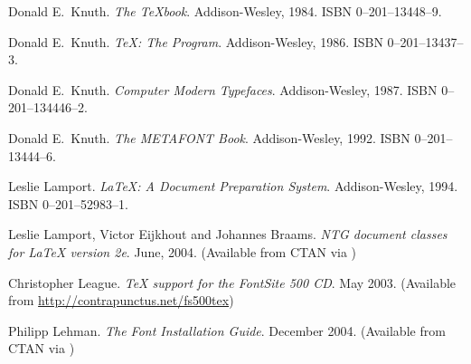 \begin{thebibliography}{GMS94A}
  Donald E.~Knuth.
  \newblock \emph{The TeXbook}.
  \newblock Addison-Wesley, 1984.
  \newblock ISBN 0--201--13448--9.

  Donald E.~Knuth.
  \newblock \emph{TeX: The Program}.
  \newblock Addison-Wesley, 1986.
  \newblock ISBN 0--201--13437--3.

  Donald E.~Knuth.
  \newblock \emph{Computer Modern Typefaces}.
  \newblock Addison-Wesley, 1987.
  \newblock ISBN 0--201--134446--2.

  Donald E.~Knuth.
  \newblock \emph{The METAFONT Book}.
  \newblock Addison-Wesley, 1992.
  \newblock ISBN 0--201--13444--6.

  Leslie Lamport.
  \newblock \emph{LaTeX: A Document Preparation System}.
  \newblock Addison-Wesley, 1994.
  \newblock ISBN 0--201--52983--1.

  Leslie Lamport, Victor Eijkhout and Johannes Braams.
  \newblock \emph{NTG document classes for LaTeX version 2e}.
  \newblock June, 2004.
  \newblock (Available from CTAN via
  ) 

\begin{comment}
\bibitem[LMB99]{CLASSES}
  Leslie Lamport, Frank Mittelbach and Johannes Braams.
  \newblock \emph{Standard document classes for LaTeX version 2e}.
  \newblock September, 1999.
  \newblock (Available from CTAN as \url{/macros/latex/base/classes.dtx})

\bibitem[Law90]{LAWSON90}
  Alexander Lawson.
  \newblock \emph{Anatomy of a Typeface}.
  \newblock David R.~Godine, 1990. 
  \newblock ISBN 0--87923--333--8.

\bibitem[LA90]{LAWSONAGNER90}
  Alexander S.~Lawson with Dwight Agner.
  \newblock \emph{Printing Types: An Introduction}.
  \newblock Beacon Press, 1990. 
  \newblock ISBN 0--8070--6661--3.
\end{comment}

  Christopher League.
  \newblock \emph{TeX support for the FontSite 500 CD}.
  \newblock May 2003.
  \newblock (Available from 
             \url{http://contrapunctus.net/fs500tex})

  Philipp Lehman.
  \newblock \emph{The Font Installation Guide}.
  \newblock December 2004.
  \newblock (Available from CTAN via
             )


\end{thebibliography}
